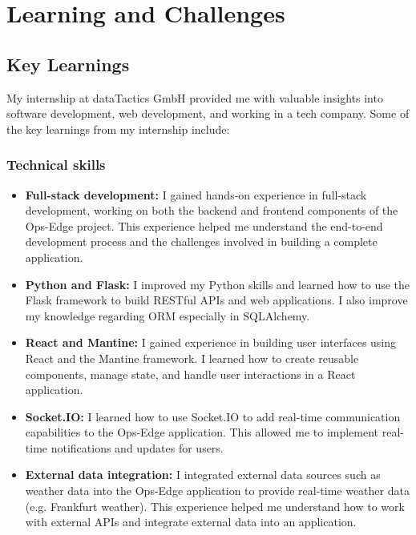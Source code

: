 \chapter{Learning and Challenges}
\label{ch:learning_challenges}

%
%

\section{Key Learnings}
\label{sec:learning_challenges:key_learnings}

My internship at dataTactics GmbH provided me with valuable insights into software development, web development, and working in a tech company. Some of the key learnings from my internship include:

\subsection{Technical skills}
\label{subsec:learning_challenges:technical_skills}

\begin{itemize}
    \item \textbf{Full-stack development:} I gained hands-on experience in full-stack development, working on both the backend and frontend components of the Ops-Edge project. This experience helped me understand the end-to-end development process and the challenges involved in building a complete application.
    \item \textbf{Python and Flask:} I improved my Python skills and learned how to use the Flask framework to build RESTful APIs and web applications. I also improve my knowledge regarding ORM especially in SQLAlchemy.
    \item \textbf{React and Mantine:} I gained experience in building user interfaces using React and the Mantine framework. I learned how to create reusable components, manage state, and handle user interactions in a React application.
    \item \textbf{Socket.IO:} I learned how to use Socket.IO to add real-time communication capabilities to the Ops-Edge application. This allowed me to implement real-time notifications and updates for users.
    \item \textbf{External data integration:} I integrated external data sources such as weather data into the Ops-Edge application to provide real-time weather data (e.g. Frankfurt weather). This experience helped me understand how to work with external APIs and integrate external data into an application.
\end{itemize}

